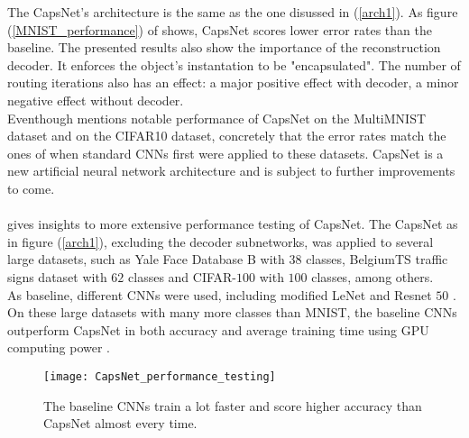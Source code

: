 \documentclass{article}
\begin{document}
{The CapsNet's architecture is the same as the one disussed in (\ref{arch1}). As figure (\ref{MNIST_performance}) of \cite{hinton17} shows, CapsNet scores lower error rates than the baseline. The presented results also show the importance of the reconstruction decoder. It enforces the object's instantation to be "encapsulated". The number of routing iterations also has an effect: a major positive effect with decoder, a minor negative effect without decoder.\\
Eventhough \cite{hinton17} mentions notable performance of CapsNet on the MultiMNIST dataset and on the CIFAR10 dataset, concretely that the error rates match the ones of when standard CNNs first were applied to these datasets. CapsNet is a new artificial neural network architecture and is subject to further improvements to come.\\
\\
\cite{CapsNet_test_eval} gives insights to more extensive performance testing of CapsNet. The CapsNet as in figure (\ref{arch1}), excluding the decoder subnetworks, was applied to several large datasets, such as Yale Face Database B \cite{yale} with $38$ classes, BelgiumTS traffic signs dataset \cite{belgium} with $62$ classes and CIFAR-$100$ \cite{cifar100} with $100$ classes, among others.\\
As baseline, different CNNs were used, including modified LeNet \cite{yann} and Resnet $50$ \cite{resnet50}.\\
On these large datasets with many more classes than MNIST, the baseline CNNs outperform CapsNet in both accuracy and average training time using GPU computing power \cite{CapsNet_test_eval}.

\begin{figure}[!htb]
\vskip 0.2in
\begin{center}
\centerline{\texttt{[image: CapsNet\_performance\_testing]}}
\caption{ \cite{CapsNet_test_eval} The baseline CNNs train a lot faster and score higher accuracy than CapsNet almost every time.  }
\end{center}
\vskip -0.2in
\end{figure}

}
\end{document}

